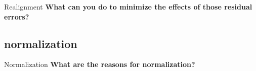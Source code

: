 \documentclass{beamer}
\begin{document}
\begin{frame}{Realignment}
  \textbf{What can you do to minimize the effects of those residual errors?}

\end{frame}


\subsection[normalization]{normalization}

\begin{frame}{Normalization}
  \textbf{What are the reasons for normalization?}

\end{frame}    

% 


\end{document}
